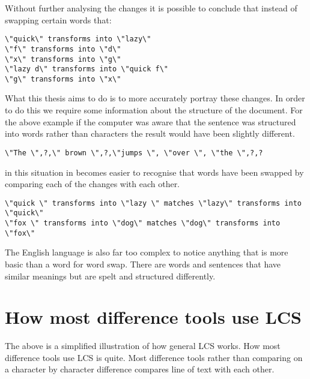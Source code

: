 Without further analysing the changes it is possible to conclude that instead of swapping certain words that:

\begin{verbatim}
\"quick\" transforms into \"lazy\"
\"f\" transforms into \"d\"
\"x\" transforms into \"g\"
\"lazy d\" transforms into \"quick f\"
\"g\" transforms into \"x\"
\end{verbatim}

What this thesis aims to do is to more accurately portray these changes.
In order to do this we require some information about the structure of the document.
For the above example if the computer was aware that the sentence was structured into words rather than characters the result would have been slightly different.

\begin{verbatim}
\"The \",?,\" brown \",?,\"jumps \", \"over \", \"the \",?,?
\end{verbatim}

in this situation in becomes easier to recognise that words have been swapped by comparing each of the changes with each other.  

\begin{verbatim}
\"quick \" transforms into \"lazy \" matches \"lazy\" transforms into \"quick\"
\"fox \" transforms into \"dog\" matches \"dog\" transforms into \"fox\" 
\end{verbatim}

The English language is also far too complex to notice anything that is more basic than a word for word swap.
There are words and sentences that have similar meanings but are spelt and structured differently.

\section{How most difference tools use LCS}
The above is a simplified illustration of how general LCS works.
How most difference tools use LCS is quite.
Most difference tools rather than comparing on a character by character difference compares line of text with each other.

% 
 
 


